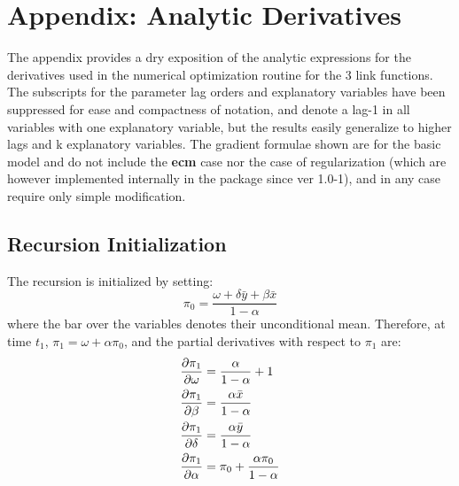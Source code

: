 \section{Appendix: Analytic Derivatives}\label{sec:Appendix}
The appendix provides a dry exposition of the analytic expressions for the derivatives used in the numerical
optimization routine for the 3 link functions. The subscripts for the parameter lag orders and explanatory
variables have been suppressed for ease and compactness of notation, and denote a lag-1 in all variables with
one explanatory variable, but the results easily generalize to higher lags and k explanatory variables. 
The gradient formulae shown are for the basic model and do not include the \textbf{ecm} case nor the case of 
regularization (which are however implemented internally in the package since ver 1.0-1), and in any case require 
only simple modification.
\subsection{Recursion Initialization}
The recursion is initialized by setting:
\begin{equation}\label{eq:rcs}
{\pi _0} = \frac{{\omega  + \delta \bar y + \beta \bar x}}{{1 - \alpha }}
\end{equation}
where the bar over the variables denotes their unconditional mean. Therefore, at time $t_1$, ${\pi _1} = \omega  + \alpha {\pi _0}$, and the partial derivatives with respect to $\pi_1$ are:
\begin{equation}\label{eq:rcsderiv}
\begin{gathered}
  \frac{{\partial {\pi _1}}}
{{\partial \omega }} = \frac{\alpha }
{{1 - \alpha }} + 1 \hfill \\
  \frac{{\partial {\pi _1}}}
{{\partial \beta }} = \frac{{\alpha \bar x}}
{{1 - \alpha }} \hfill \\
  \frac{{\partial {\pi _1}}}
{{\partial \delta }} = \frac{{\alpha \bar y}}
{{1 - \alpha }} \hfill \\
  \frac{{\partial {\pi _1}}}
{{\partial \alpha }} = {\pi _0} + \frac{{\alpha {\pi _0}}}
{{1 - \alpha }} \hfill \\
\end{gathered}
\end{equation}
